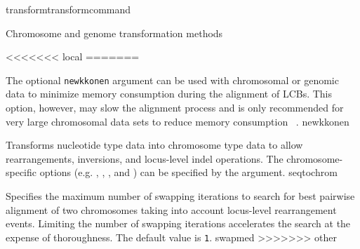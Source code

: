 \begin{command}{transform}{transformcommand}
\begin{arguments}
\begin{argumentgroup}{Chromosome and genome transformation methods}
{\begin{statement}
\begin{description}
\begin{description}
<<<<<<< local
=======
                    
                    {The optional \texttt {newkkonen} argument can be used with 
                    chromosomal or genomic data to minimize memory 
                    consumption during the alignment of LCBs.  This option, 
                    however, may slow the alignment process and is only 
                    recommended for very large chromosomal data sets to 
                    reduce memory consumption ~\cite{wheelerhonginprep}.}
                    {newkkonen}
                     
                    {Transforms nucleotide type data into chromosome type data to allow
                    rearrangements, inversions, and locus-level indel operations.  The
                    chromosome-specific options (e.g.  , 
                    , , and 
                    ) can be specified by the argument.}
                    {seqtochrom}
       
                    {Specifies the maximum number of swapping iterations
                    to search for best pairwise alignment of two chromosomes
                    taking into account locus-level rearrangement events. 
                    Limiting the number of swapping
                    iterations accelerates the search at the expense of
                    thoroughness. The default value is \texttt{1}.}
                    {swapmed}
>>>>>>> other


\end{description}
\end{description}
\end{statement}}
\end{argumentgroup}
\end{arguments}
\end{command}
